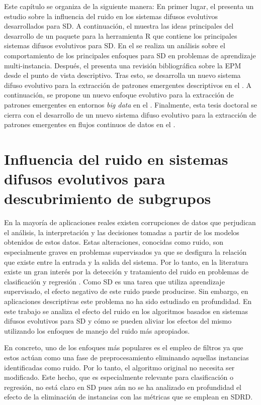 \documentclass[c5paper,10pt,twoside]{book}	   	%
\begin{document}
Este capítulo se organiza de la siguiente manera: En primer lugar, el  presenta un estudio sobre la influencia del ruido en los sistemas difusos evolutivos desarrollados para \ac{SD}. A continuación, el  muestra las ideas principales del desarrollo de un paquete para la herramienta R que contiene los principales sistemas difusos evolutivos para \ac{SD}. En el  se realiza un análisis sobre el comportamiento de los principales enfoques para \ac{SD} en problemas de aprendizaje multi-instancia. Después, el  presenta una revisión bibliográfica sobre la \ac{EPM} desde el punto de vista descriptivo. Tras esto, se desarrolla un nuevo sistema difuso evolutivo para la extracción de patrones emergentes descriptivos en el . A continuación, se propone un nuevo enfoque evolutivo para la extracción de patrones emergentes en entornos \textit{big data} en el . Finalmente, esta tesis doctoral se cierra con el desarrollo de un nuevo sistema difuso evolutivo para la extracción de patrones emergentes en flujos continuos de datos en el .


\section{Influencia del ruido en sistemas difusos evolutivos para descubrimiento de subgrupos} \label{sec:ruido}

En la mayoría de aplicaciones reales existen corrupciones de datos que perjudican el análisis, la interpretación y las decisiones tomadas a partir de los modelos obtenidos de estos datos. Estas alteraciones, conocidas como ruido, son especialmente graves en problemas supervisados ya que se desfigura la relación que existe entre la entrada y la salida del sistema. Por lo tanto, en la literatura existe un gran interés por la detección y tratamiento del ruido en problemas de clasificación y regresión \cite{garcia2015}. Como \ac{SD} es una tarea que utiliza aprendizaje supervisado, el efecto negativo de este ruido puede producirse. Sin embargo, en aplicaciones descriptivas este problema no ha sido estudiado en profundidad. En este trabajo se analiza el efecto del ruido en los algoritmos basados en sistemas difusos evolutivos para \ac{SD} y cómo se pueden aliviar los efectos del mismo utilizando los enfoques de manejo del ruido más apropiados.

En concreto, uno de los enfoques más populares es el empleo de filtros \cite{Brodley99identifyingmislabeled,Khoshgoftaar07ImprovingSoftware} ya que estos actúan como una fase de preprocesamiento eliminando aquellas instancias identificadas como ruido. Por lo tanto, el algoritmo original no necesita ser modificado. Este hecho, que es especialmente relevante para clasificación o regresión, no está claro en \ac{SD} pues aún no se ha analizado en profundidad el efecto de la eliminación de instancias con las métricas que se emplean en \ac{SDRD}.
\end{document}
